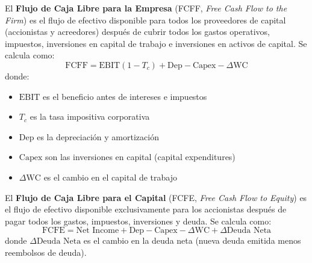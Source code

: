 \begin{definicion}
El \textbf{Flujo de Caja Libre para la Empresa} (FCFF, \textit{Free Cash Flow to the Firm}) es el flujo de efectivo disponible para todos los proveedores de capital (accionistas y acreedores) después de cubrir todos los gastos operativos, impuestos, inversiones en capital de trabajo e inversiones en activos de capital. Se calcula como:
\begin{equation}
\text{FCFF} = \text{EBIT}(1 - T_c) + \text{Dep} - \text{Capex} - \Delta \text{WC}
\end{equation}
donde:
\begin{itemize}
\item $\text{EBIT}$ es el beneficio antes de intereses e impuestos
\item $T_c$ es la tasa impositiva corporativa
\item $\text{Dep}$ es la depreciación y amortización
\item $\text{Capex}$ son las inversiones en capital (capital expenditures)
\item $\Delta \text{WC}$ es el cambio en el capital de trabajo
\end{itemize}
\end{definicion}

\begin{definicion}
El \textbf{Flujo de Caja Libre para el Capital} (FCFE, \textit{Free Cash Flow to Equity}) es el flujo de efectivo disponible exclusivamente para los accionistas después de pagar todos los gastos, impuestos, inversiones y deuda. Se calcula como:
\begin{equation}
\text{FCFE} = \text{Net Income} + \text{Dep} - \text{Capex} - \Delta \text{WC} + \Delta \text{Deuda Neta}
\end{equation}
donde $\Delta \text{Deuda Neta}$ es el cambio en la deuda neta (nueva deuda emitida menos reembolsos de deuda).
\end{definicion}

